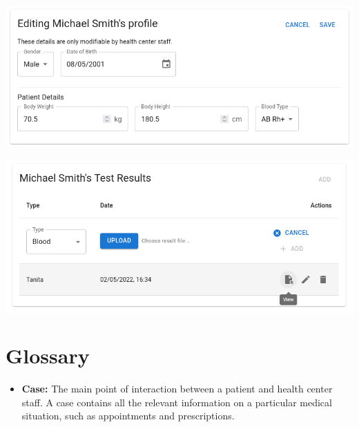 \documentclass[a4paper, 12pt, titlepage]{article}
\begin{document}
  \includegraphics[width=\linewidth]{uim_editprofile.png}

  \includegraphics[width=\linewidth]{uim_testresult.png}


  \section{Glossary}

  \begin{itemize}
    \item \textbf{Case:} The main point of interaction between a patient and health center staff.
      A case contains all the relevant information on a particular medical situation,
      such as appointments and prescriptions.

  \end{itemize}
\end{document}
